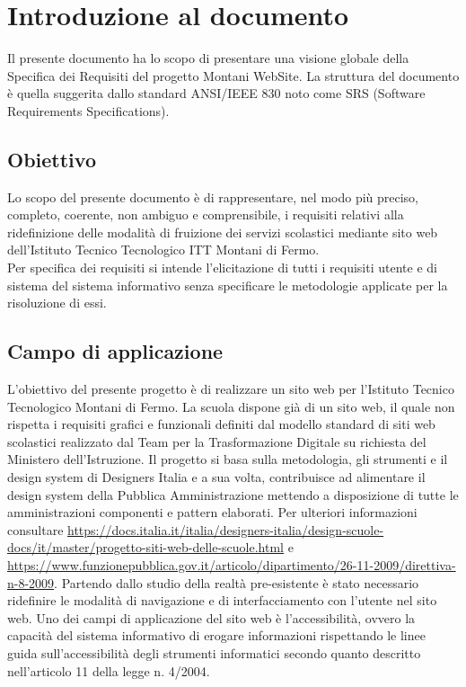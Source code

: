 \documentclass{article}
\begin{document}
	\section{\textbf{Introduzione al documento}}
	\flushleft
	\normalsize
	Il presente documento ha lo scopo di presentare una visione globale della Specifica dei Requisiti del progetto Montani WebSite. La struttura del documento è quella suggerita dallo standard ANSI/IEEE  830 noto come SRS (Software Requirements Specifications).
	\normalsize
	 \subsection{\textbf{Obiettivo}} 
	\flushleft
	\normalsize
	Lo scopo del presente documento è di rappresentare, nel modo più preciso, completo, coerente, non  ambiguo e comprensibile, i requisiti relativi alla ridefinizione delle modalità di fruizione dei servizi scolastici mediante sito web dell'Istituto Tecnico Tecnologico ITT Montani di Fermo.\\ 
	Per specifica dei requisiti si intende l’elicitazione di tutti i requisiti utente e di sistema del sistema informativo senza specificare le metodologie applicate per la risoluzione di essi.
	
	\subsection{\textbf{Campo di applicazione}}
	L'obiettivo del presente progetto è di realizzare un sito web per l'Istituto Tecnico Tecnologico Montani di Fermo. La scuola dispone già di un sito web, il quale non rispetta i requisiti grafici e funzionali definiti dal modello standard di siti web scolastici realizzato dal Team per la Trasformazione Digitale su richiesta del Ministero dell'Istruzione. Il progetto si basa sulla metodologia, gli strumenti e il design system di Designers Italia e a sua volta, contribuisce ad alimentare il design system della Pubblica Amministrazione mettendo a disposizione di tutte le amministrazioni componenti e pattern elaborati. Per ulteriori informazioni consultare \url{https://docs.italia.it/italia/designers-italia/design-scuole-docs/it/master/progetto-siti-web-delle-scuole.html} e \url{https://www.funzionepubblica.gov.it/articolo/dipartimento/26-11-2009/direttiva-n-8-2009}. Partendo dallo studio della realtà pre-esistente è stato necessario ridefinire le modalità di navigazione e di interfacciamento con l'utente nel sito web. 
	Uno dei campi di applicazione del sito web è l'accessibilità, ovvero la capacità del sistema informativo di erogare informazioni rispettando le linee guida sull’accessibilità degli strumenti informatici secondo quanto descritto nell’articolo 11 della legge n. 4/2004.
	
\end{document}
